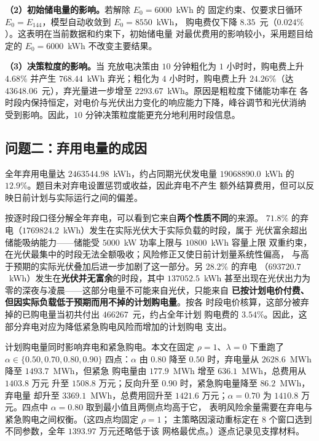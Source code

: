 \textbf{（2）初始储电量的影响。}若解除 $E_0 = 6000$~kWh 的
固定约束、仅要求日循环 $E_0 = E_{144}$，模型自动收敛到 $E_0 = 8550$~kWh，
购电费仅下降 $8.35$~元（$0.024\%$）。这表明在当前数据和约束下，初始储电量
对最优费用的影响较小，采用题目给定的 $E_0 = 6000$~kWh 不改变主要结果。

\textbf{（3）决策粒度的影响。}当
充放电决策由 $10$ 分钟粗化为 $1$ 小时时，购电费上升 $4.68\%$ 并产生
$768.44$~kWh 弃光；粗化为 $4$ 小时时，购电费上升 $24.26\%$（达
$43648.06$~元），弃光量进一步增至 $2293.67$~kWh。原因是粗粒度下储能功率在
各时段内保持恒定，对电价与光伏出力变化的响应能力下降，峰谷调节和光伏消纳
受到影响。因此，$10$ 分钟决策粒度能更充分地利用时段信息。

\subsection{问题二：弃用电量的成因}

全年弃用电量达 $2463544.98$~kWh，约占同期光伏发电量
$19068890.0$~kWh 的 $12.9\%$。题目未对弃电设置惩罚或收益，因此弃电不产生
额外结算费用，但可以反映日前计划与实际运行之间的偏差。

按逐时段口径分解全年弃电，可以看到它来自\textbf{两个性质不同}的来源。
$71.8\%$ 的弃电（$1769824.2$~kWh）发生在实际光伏大于实际负载的时段，属于
光伏富余超出储能吸纳能力——储能受 $5000$~kW 功率上限与 $10800$~kWh 容量上限
双重约束，在光伏最集中的时段无法全额吸收；风险修正又使日前计划量系统性偏高，
与高于预期的实际光伏叠加后进一步加剧了这一部分。另 $28.2\%$ 的弃电
（$693720.7$~kWh）发生在\textbf{光伏并无富余}的时段，其中 $137052.5$~kWh
甚至出现在光伏出力为零的深夜与凌晨——这部分电量不可能来自光伏，只能来自
\textbf{已按计划电价付费、但因实际负载低于预期而用不掉的计划购电量}。按各
时段电价核算，这部分被弃掉的已购电量当初共付出 $466267$~元，约占全年计划
购电费的 $3.54\%$。因此，这部分弃电对应为降低紧急购电风险而增加的计划购电
支出。

计划购电量同时影响弃电和紧急购电。本文在固定
$\rho=1$、$\lambda=0$ 下重跑了 $\alpha\in\{0.50,0.70,0.80,0.90\}$ 四点：$\alpha$
由 $0.80$ 降至 $0.50$ 时，弃电量从 $2628.6$~MWh 降至 $1493.7$~MWh，但紧急
购电量由 $177.9$~MWh 增至 $636.1$~MWh，总费用从 $1403.8$ 万元
升至 $1508.8$ 万元；反向升至 $0.90$ 时，紧急购电量降至 $86.2$~MWh，弃电量
却升至 $3369.1$~MWh，总费用回升至 $1421.6$ 万元；$\alpha=0.70$ 为
$1410.8$ 万元。四点中 $\alpha=0.80$ 取到最小值且两侧点均高于它，
表明风险余量需要在弃电与紧急购电之间权衡。（这四点均固定 $\rho=1$；
主策略因滚动重标定在 $8$ 个窗口选到不同参数，全年 $1393.97$ 万元还略低于该
网格最优点。）逐点记录见支撑材料。

